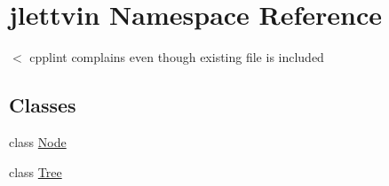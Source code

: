 \hypertarget{namespacejlettvin}{}\section{jlettvin Namespace Reference}
\label{namespacejlettvin}


$<$ cpplint complains even though existing file is included  


\subsection*{Classes}
\begin{DoxyCompactItemize}
\item 
class \hyperlink{classjlettvin_1_1_node}{Node}
\item 
class \hyperlink{classjlettvin_1_1_tree}{Tree}
\end{DoxyCompactItemize}
